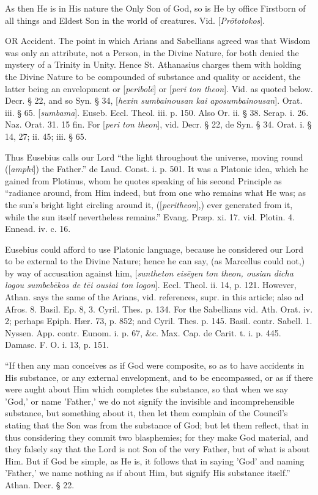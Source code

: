 As then He is in His nature the Only Son of God,
so is He by office Firstborn of all things and Eldest Son in the world
of creatures. Vid. [\emph{Pr\={o}totokos}].

\xsection{[Sumbebekos]}

OR
Accident. The point in which Arians and Sabellians agreed was that
Wisdom was only an attribute, not a Person, in the Divine Nature, for
both denied the mystery of a Trinity in Unity. Hence St. Athanasius
charges them with holding the Divine Nature to be compounded of
substance and quality or accident, the latter being an envelopment or
[\emph{peribol\={e}}] or [\emph{peri ton theon}]. Vid. as quoted
below. Decr. § 22, and so Syn. § 34, [\emph{hexin sumbainousan kai
aposumbainousan}]. Orat. iii. § 65. [\emph{sumbama}]. Euseb. Eccl.
Theol. iii. p. 150. Also Or. ii. § 38. Serap. i. 26. Naz. Orat. 31.
15 fin. For [\emph{peri ton theon}], vid. Decr. § 22, de Syn. § 34.
Orat. i. § 14, 27; ii. 45; iii. § 65.

Thus Eusebius calls our Lord ``the light
throughout the universe, moving round ([\emph{amphi}]) the Father.'' de
Laud. Const. i. p. 501. It was a Platonic idea, which he gained from
Plotinus, whom he quotes speaking of his second Principle as ``radiance
around, from Him indeed, but from one who remains what He was; as the
sun's bright light circling around it, ([\emph{peritheon}],) ever
generated from it, while the sun itself nevertheless remains.'' Evang.
Præp. xi. 17. vid. Plotin. 4. Ennead. iv. c. 16.

Eusebius could afford to use Platonic language,
because he considered our Lord to be external to the Divine
Nature; hence he can say, (as Marcellus could not,) by way of
accusation against him, [\emph{suntheton eis\={e}gen ton theon, ousian
dicha logou sumbeb\={e}kos de t\={e}i ousiai ton logon}].
Eccl. Theol. ii. 14, p. 121. However, Athan. says the same of the
Arians, vid. references, supr. in this article; also ad Afros. 8.
Basil. Ep. 8, 3. Cyril. Thes. p. 134. For the Sabellians vid. Ath.
Orat. iv. 2; perhaps Epiph. Hær. 73, p. 852; and Cyril. Thes. p. 145.
Basil. contr. Sabell. 1. Nyssen. App. contr. Eunom. i. p. 67, \&c.
Max. Cap. de Carit. t. i. p. 445. Damasc. F. O. i. 13, p. 151.

``If then any man conceives as if God were
composite, so as to have accidents in His substance, or any external
envelopment, and to be encompassed, or as if there were aught about
Him which completes the substance, so that when we say 'God,' or name
'Father,' we do not signify the invisible and incomprehensible
substance, but something about it, then let them complain of the
Council's stating that the Son was from the substance of God; but let
them reflect, that in thus considering they commit two blasphemies;
for they make God material, and they falsely say that the Lord is not
Son of the very Father, but of what is about Him. But if God be
simple, as He is, it follows that in saying 'God' and naming 'Father,'
we name nothing as if about Him, but signify His substance itself.''
Athan. Decr. § 22.

